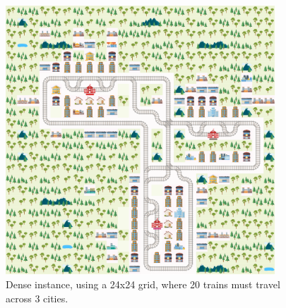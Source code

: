 \documentclass{llncs}
\begin{document}
\begin{figure}[h]
	
	\centering
	\includegraphics[width=0.9\textwidth]{dense/dense_0_1}
	\caption{Dense instance, using a 24x24 grid, where 20 trains must travel across 3 cities.}
	\label{dense_0_1_fullpage}
\end{figure}
\end{document}
